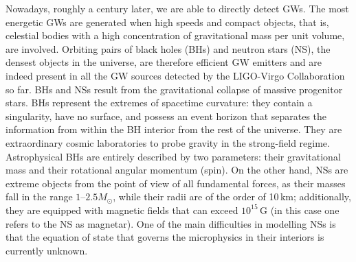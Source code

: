 \documentclass[binding=0.6cm, LaM]{sapthesis}
\begin{document}
	Nowadays, roughly a century later, we are able to directly detect GWs.  
	The most energetic GWs are generated when high speeds and compact objects, that is, 	
	celestial bodies with a high concentration of gravitational mass per unit volume, are involved.
	Orbiting pairs of black holes (BHs) and neutron stars (NS), the densest objects in the universe,
	are therefore efficient GW emitters and are indeed present in all the GW sources detected by the LIGO-Virgo Collaboration so far.
        BHs and NSs result from the gravitational collapse of massive progenitor stars.
        BHs represent the extremes of spacetime curvature:
        they contain a singularity, have no surface, and possess an event horizon that separates the information
        from within the BH interior from the rest of the universe.
        They are extraordinary cosmic laboratories to probe gravity in the strong-field regime.
        Astrophysical BHs are entirely described by two parameters: their gravitational mass and their rotational angular momentum (spin).
        On the other hand, NSs are extreme objects from the point of view of all fundamental forces, 
	as their masses fall in the range $1$--$2.5M_\odot$, while their radii are of the order of 10\,km; 
	additionally, they are equipped with magnetic fields that can exceed $10^{15}\,$G 
	(in this case one refers to the NS as magnetar). 
	One of the main difficulties in modelling NSs is that the equation of state that governs the microphysics in their interiors is currently unknown.
\end{document}
